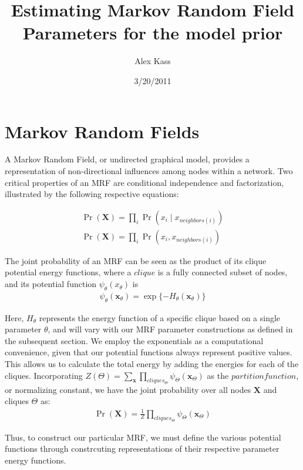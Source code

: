 \documentclass{article}
\title{Estimating Markov Random Field Parameters for the model prior}
\author{Alex Kass}
\date{3/20/2011}
\begin{document}
\section{Markov Random Fields}
%

A Markov Random Field, or undirected graphical model, provides a representation of non-directional influences among nodes within a network.  Two critical properties of an MRF are conditional independence and factorization, illustrated by the following respective equations:

\begin{eqnarray*}
\Pr(\mathbf{X}) = \prod_i{\Pr(x_i \mid x_{neighbors(i)})}\\
\Pr(\mathbf{X}) = \prod_i{\Pr(x_i, x_{neighbors(i)})}
\end{eqnarray*}

The joint probability of an MRF can be seen as the product of its clique potential energy functions, where a $clique$ is a fully connected subset of nodes, and its potential function $\psi_\theta(x_\theta)$ is 
\begin{eqnarray*}
\psi_\theta(\mathbf{x}_\theta) = \exp\{-H_\theta(\mathbf{x}_\theta)\}
\end{eqnarray*}

Here, $H_\theta$ represents the energy function of a specific clique based on a single parameter $\theta$, and will vary with our MRF parameter constructions as defined in the subsequent section.  We employ the exponentials as a computational convenience, given that our potential functions always represent positive values.  This allows us to calculate the total energy by adding the energies for each of the cliques.  Incorporating $Z(\Theta) = \sum_{\mathbf{x}}\prod_{cliques_\Theta}{\psi_\Theta(\mathbf{x}_\Theta)}$ as the $partition function$, or normalizing constant, we have the joint probability over all nodes $\mathbf{X}$ and cliques $\Theta$ as:
\begin{eqnarray*}
\Pr(\mathbf{X}) = \frac{1}{Z}\prod_{cliques_\Theta}{\psi_\Theta(\mathbf{x}_\Theta)}
\end{eqnarray*}

Thus, to construct our particular MRF, we must define the various potential functions through constrcuting representations of their respective parameter energy functions.
\end{document}

